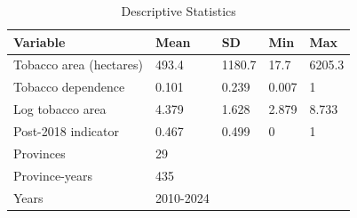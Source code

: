 \begin{table}[ht]
\centering
\begin{tabular}{lllll}
  \hline
Variable & Mean & SD & Min & Max \\ 
  \hline
Tobacco area (hectares) & 493.4 & 1180.7 & 17.7 & 6205.3 \\ 
  Tobacco dependence & 0.101 & 0.239 & 0.007 & 1 \\ 
  Log tobacco area & 4.379 & 1.628 & 2.879 & 8.733 \\ 
  Post-2018 indicator & 0.467 & 0.499 & 0 & 1 \\ 
  Provinces & 29 &  &  &  \\ 
  Province-years & 435 &  &  &  \\ 
  Years & 2010-2024 &  &  &  \\ 
   \hline
\end{tabular}
\caption{Descriptive Statistics} 
\label{tab:desc_stats}
\end{table}
